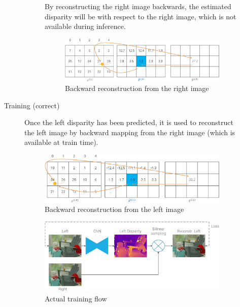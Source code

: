 \begin{description}
\begin{description}
\begin{description}
                        \begin{remark}
                            By reconstructing the right image backwards, the estimated disparity will be with respect to the right image, which is not available during inference.
                        \end{remark}

                        \begin{figure}[H]
                            \centering
                            \includegraphics[width=0.65\linewidth]{./img/_monodepth_train_naive.pdf}
                            \caption{Backward reconstruction from the right image}
                        \end{figure}
                \end{description}

            \item[Training (correct)] 
                Once the left disparity has been predicted, it is used to reconstruct the left image by backward mapping from the right image (which is available at train time).

                \begin{figure}[H]
                    \centering
                    \includegraphics[width=0.65\linewidth]{./img/_monodepth_train_correct.pdf}
                    \caption{Backward reconstruction from the left image}
                \end{figure}

                \begin{figure}[H]
                    \centering
                    \includegraphics[width=0.7\linewidth]{./img/_monodepth_correct.pdf}
                    \caption{Actual training flow}
                \end{figure}
        \end{description}

\end{description}